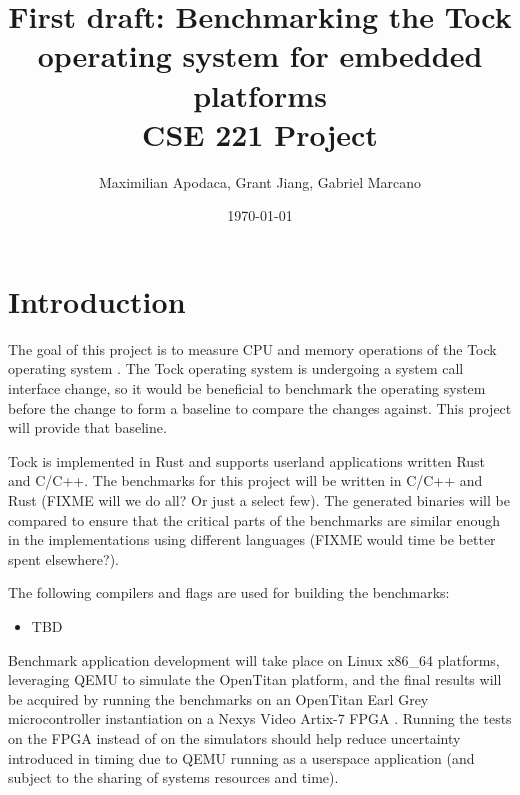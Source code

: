 \documentclass{article}
\title{First draft: Benchmarking the Tock operating system for embedded platforms \\[0.2em]\smaller{} CSE 221 Project}
\author{Maximilian Apodaca, Grant Jiang, Gabriel Marcano}
\date{\today}
\begin{document}
\maketitle

\section{Introduction}

The goal of this project is to measure CPU and memory operations of the Tock operating system \cite{levy17multiprogramming}. The Tock operating system is undergoing a system call interface change, so it would be beneficial to benchmark the operating system before the change to form a baseline to compare the changes against. This project will provide that baseline. %

Tock is implemented in Rust and supports userland applications written Rust and C/C++. The benchmarks for this project will be written in C/C++ and Rust (FIXME will we do all? Or just a select few). The generated binaries will be compared to ensure that the critical parts of the benchmarks are similar enough in the implementations using different languages (FIXME would time be better spent elsewhere?). %

The following compilers and flags are used for building the benchmarks:
\begin{itemize}
    \item TBD
\end{itemize}

Benchmark application development will take place on Linux x86\_64 platforms, leveraging QEMU to simulate the OpenTitan platform, and the final results will be acquired by running the benchmarks on an OpenTitan Earl Grey microcontroller instantiation on a Nexys Video Artix-7 FPGA \cite{opentitangithub}. Running the tests on the FPGA instead of on the simulators should help reduce uncertainty introduced in timing due to QEMU running as a userspace application (and subject to the sharing of systems resources and time). %
\end{document}
